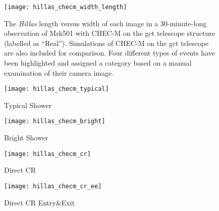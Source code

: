 \begin{figure}
  \centering
  \texttt{[image: hillas\_checm\_width\_length]}
  \caption[\textit{Hillas} length versus width for an on-sky observation run with CHEC-M.]{The \textit{Hillas} length versus width of each image in a 30-minute-long observation of Mrk501 with CHEC-M on the \gls{gct} telescope structure (labelled as ``Real''). Simulations of CHEC-M on the \gls{gct} telescope are also included for comparison. Four different types of events have been highlighted and assigned a category based on a manual examination of their camera image.}
  \label{fig:hillas_checm_width_length}
\end{figure}

\begin{sidewaysfigure}
  \begin{subfigure}[b]{0.49\textwidth}
    \texttt{[image: hillas\_checm\_typical]}
    \caption{Typical Shower}
    \label{fig:hillas_checm_typical}
  \end{subfigure}
  \hfill
  \begin{subfigure}[b]{0.49\textwidth}
    \texttt{[image: hillas\_checm\_bright]}
    \caption{Bright Shower}
    \label{fig:hillas_checm_bright}
  \end{subfigure}
   \hfill
  \begin{subfigure}[b]{0.49\textwidth}
    \texttt{[image: hillas\_checm\_cr]}
    \caption{Direct CR}
    \label{fig:hillas_checm_cr}
  \end{subfigure}
  \hfill
  \begin{subfigure}[b]{0.49\textwidth}
    \texttt{[image: hillas\_checm\_cr\_ee]}
    \caption{Direct CR Entry\&Exit}
    \label{fig:hillas_checm_cr_ee}
  \end{subfigure}
  \caption[Selection of on-sky images.]{A selection of images taken by \gls{chec-m} during its second on-telescope campaign. The images chosen correspond to the individually highlighted events in Figure~\ref{fig:hillas_checm_width_length}.}
  \label{fig:checm_cherenkov_images}
\end{sidewaysfigure}

